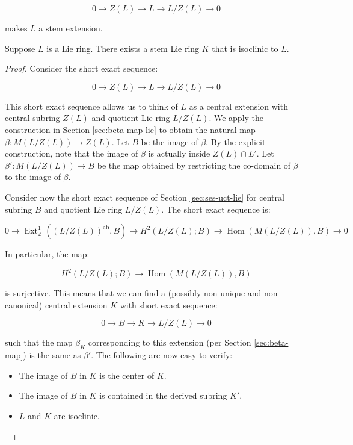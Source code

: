 \documentclass{ucetd}
\begin{document}
$$0 \to Z(L) \to L \to L/Z(L) \to 0$$

makes $L$ a stem extension.

\begin{theorem}\label{thm:stem-lie-ring-existence}
  Suppose $L$ is a Lie ring. There exists a stem Lie ring $K$ that is
  isoclinic to $L$.
\end{theorem}

\begin{proof}
  Consider the short exact sequence:

  $$0 \to Z(L) \to L \to L/Z(L) \to 0$$

  This short exact sequence allows us to think of $L$ as a central
  extension with central subring $Z(L)$ and quotient Lie ring
  $L/Z(L)$. We apply the construction in Section \ref{sec:beta-map-lie} to
  obtain the natural map $\beta:M(L/Z(L)) \to Z(L)$. Let $B$ be the
  image of $\beta$. By the explicit construction, note that the image of
  $\beta$ is actually inside $Z(L) \cap L'$. Let $\beta':M(L/Z(L)) \to
  B$ be the map obtained by restricting the co-domain of $\beta$ to
  the image of $\beta$.

  Consider now the short exact sequence of Section \ref{sec:ses-uct-lie}
  for central subring $B$ and quotient Lie ring $L/Z(L)$. The short exact sequence is:

  $$0 \to \operatorname{Ext}^1_{\mathbb{Z}}((L/Z(L))^{\operatorname{ab}},B) \to H^2(L/Z(L);B) \to \operatorname{Hom}(M(L/Z(L)),B) \to 0$$

  In particular, the map:

  $$H^2(L/Z(L);B) \to \operatorname{Hom}(M(L/Z(L)),B)$$

  is surjective. This means that we can find a (possibly non-unique
  and non-canonical) central extension $K$ with short exact sequence:

  $$0 \to B \to K \to L/Z(L) \to 0$$

  such that the map $\beta_K$ corresponding to this extension (per
  Section \ref{sec:beta-map}) is the same as $\beta'$. The following
  are now easy to verify: %

  \begin{itemize}
  \item The image of $B$ in $K$ is the center of $K$.
  \item The image of $B$ in $K$ is contained in the derived subring $K'$.
  \item $L$ and $K$ are isoclinic.
  \end{itemize}
\end{proof}
  
\end{document}
